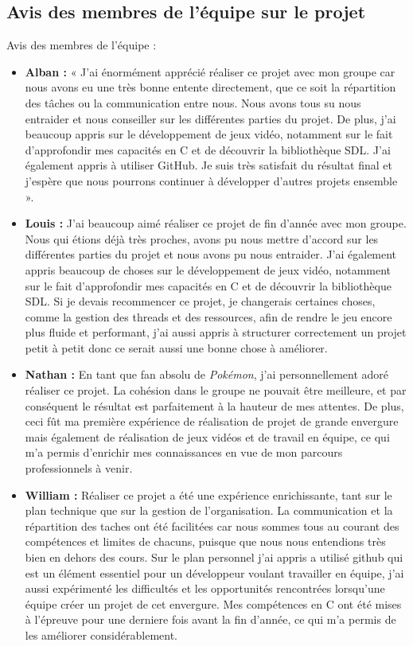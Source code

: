\documentclass[12pt,a4paper, twoside]{article}
\begin{document}
\subsection{Avis des membres de l'équipe sur le projet}
Avis des membres de l'équipe :
\begin{itemize}
    \item \textbf{Alban :} « J'ai énormément apprécié réaliser ce projet avec mon groupe car nous avons eu une très bonne entente directement, que ce soit la répartition des tâches ou la communication entre nous. Nous avons tous su nous entraider et nous conseiller sur les différentes parties du projet. De plus, j'ai beaucoup appris sur le développement de jeux vidéo, notamment sur le fait d'approfondir mes capacités en C et de découvrir la bibliothèque SDL. J'ai également appris à utiliser GitHub. Je suis très satisfait du résultat final et j'espère que nous pourrons continuer à développer d'autres projets ensemble ».
    \newline
    \item \textbf{Louis :} J'ai beaucoup aimé réaliser ce projet de fin d'année avec mon groupe. Nous qui étions déjà très proches, avons pu nous mettre d'accord sur les différentes parties du projet et nous avons pu nous entraider. J'ai également appris beaucoup de choses sur le développement de jeux vidéo, notamment sur le fait d'approfondir mes capacités en C et de découvrir la bibliothèque SDL. Si je devais recommencer ce projet, je changerais certaines choses, comme la gestion des threads et des ressources, afin de rendre le jeu encore plus fluide et performant, j'ai aussi appris à structurer correctement un projet petit à petit donc ce serait aussi une bonne chose à améliorer.
    \newline
    \item \textbf{Nathan :} En tant que fan absolu de \emph{Pokémon}, j'ai personnellement adoré réaliser ce projet. La cohésion dans le groupe ne pouvait être meilleure, et par conséquent le résultat est parfaitement à la hauteur de mes attentes. De plus, ceci fût ma première expérience de réalisation de projet de grande envergure mais également de réalisation de jeux vidéos et de travail en équipe, ce qui m'a permis d'enrichir mes connaissances en vue de mon parcours professionnels à venir.
    \newline
    \item \textbf{William :} Réaliser ce projet a été une expérience enrichissante, tant sur le plan technique que sur la gestion de l'organisation. La communication et la répartition des taches ont été facilitées car nous sommes tous au courant des compétences et limites de chacuns, puisque que nous nous entendions très bien en dehors des cours. Sur le plan personnel j'ai appris a utilisé github qui est un élément essentiel pour un développeur voulant travailler en équipe, j'ai aussi expérimenté les difficultés et les opportunités rencontrées lorsqu'une équipe créer un projet de cet envergure. Mes compétences en C ont été mises à l'épreuve pour une derniere fois avant la fin d'année, ce qui m'a permis de les améliorer considérablement.
    
\end{itemize}
\end{document}
